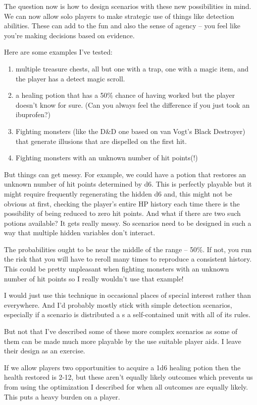 \documentclass[12pt]{article}
\begin{document}
The question now is how to design scenarios with these new possibilities
in mind.
We can now allow solo players to make strategic use of things
like detection abilities.
These can add to the
fun and also the sense of agency -- you feel like you're making decisions
based on evidence.

Here are some examples I've tested:
\begin{enumerate}
\item multiple treasure chests, all but one with a trap,
one with a magic item, and the player has a detect magic scroll.
\item a healing potion that has a 50\% chance of having worked
but the player doesn't know for sure.
(Can you always feel the difference if you just took an ibuprofen?)
\item Fighting monsters (like the D\&D one based on van Vogt's Black Destroyer) that generate illusions
that are dispelled on the first hit.
\item Fighting monsters with an unknown number of hit points(!)
\end{enumerate}

But things can get messy.
For example, we could have a potion that restores an unknown
number of hit points determined by d6.
This is perfectly playable but it might require frequently regenerating the hidden d6
and, this might not be obvious at first, checking the player's entire
HP history
each time there is the possibility of being reduced to zero hit points.
And what if there are two such potions available?
It gets really messy.
So scenarios need to be designed in such a way that multiple hidden variables don't
interact.

The probabilities ought to be near the middle of the range -- 50\%.
If not, you run the risk that you will have to reroll many times to reproduce
a consistent history.
This could be pretty unpleasant when fighting monsters with an unknown number of hit points
so I really wouldn't use that example!

I would just use this technique in occasional places of special interest
rather than everywhere.
And I'd probably mostly stick with simple detection scenarios, especially if
a scenario is distributed a s a self-contained unit with all of its rules.

But not that I've described some of these more complex scenarios as some of them
can be made much more playable by the use suitable player aids.
I leave their design as an exercise.

\iffalse
If
we allow players two opportunities to acquire a 1d6 healing potion then
the health restored is 2-12, but these aren't equally likely outcomes
which prevents us from using the optimization I described for when all
outcomes are equally likely. This puts a heavy burden on a player.
\end{document}
